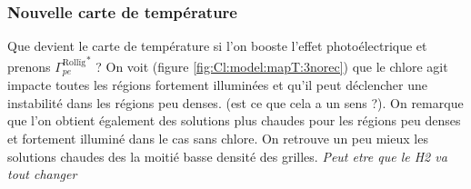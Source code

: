 \subsubsection{Nouvelle carte de température}

Que devient le carte de température si l'on booste l'effet photoélectrique et prenons ${\Gamma^{\mathrm{Rollïg}}_{pe}}^{*}$ ? On voit (figure \ref{fig:Cl:model:mapT:3norec}) que le chlore agit impacte toutes les régions fortement illuminées et qu'il peut déclencher une instabilité dans les régions peu denses. (est ce que cela a un sens ?). On remarque que l'on obtient également des solutions plus chaudes pour les régions peu denses et fortement illuminé dans le cas sans chlore. On retrouve un peu mieux les solutions chaudes des la moitié basse densité des grilles. 
\textit{Peut etre que le H2 va tout changer}

